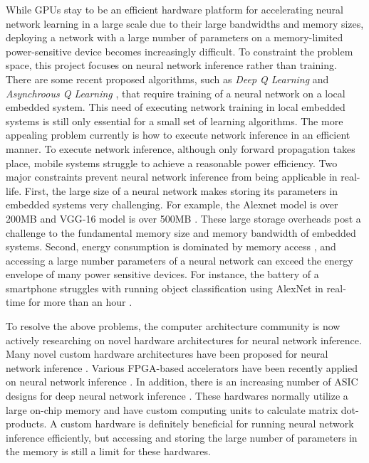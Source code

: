 \documentclass[a4paper,12pt]{report}
\begin{document}
While GPUs stay to be an efficient hardware platform for accelerating neural network learning
in a large scale due to their large bandwidths and memory sizes, deploying a network with
a large number of parameters on a memory-limited power-sensitive device becomes
increasingly difficult.
To constraint the problem space, this project focuses on
neural network inference rather than training.
There are some recent proposed algorithms, such as \textit{Deep Q Learning} \cite{Mnih}
and \textit{Asynchroous Q Learning} \cite{Mnih2016}, that require training of a
neural network on a local embedded system.
This need of executing network training in local embedded systems is still only
essential for a small set of learning algorithms.
The more appealing problem currently is how to execute network inference in
an efficient manner.
To execute network inference, although only forward propagation takes place,
mobile systems struggle to achieve a reasonable power efficiency.
Two major constraints prevent neural network inference from being applicable in real-life.
First, the large size of a neural network makes storing its parameters in embedded systems
very challenging.
For example, the Alexnet model is over 200MB and VGG-16 model is over 500MB \cite{Han15}.
These large storage overheads post a challenge to the fundamental memory size and
memory bandwidth of embedded systems.
Second, energy consumption is dominated by memory access \cite{Tien}, and accessing
a large number parameters of a neural network can exceed the energy envelope of
many power sensitive devices.
For instance, the battery of a smartphone struggles with running object classification using AlexNet
in real-time for more than an hour \cite{Tien}.

To resolve the above problems, the computer architecture community is now actively
researching on novel hardware architectures for neural network inference.
Many novel custom hardware architectures
have been proposed for neural network inference \cite{chen2014dadiannao,chen2014diannao,han2016eie,han2016ese}.
Various FPGA-based accelerators have been recently applied on neural network
inference \cite{zhang2015optimizing, Nurvitadhi:2017:FBG:3020078.3021740}.
In addition, there is an increasing number of ASIC designs for deep neural
network inference \cite{han2016eie, chen2017eyeriss}.
These hardwares normally utilize a large on-chip memory and have custom computing
units to calculate matrix dot-products.
A custom hardware is definitely beneficial for running neural network inference
efficiently, but accessing and storing the large number of parameters in the memory
is still a limit for these hardwares.
\end{document}
